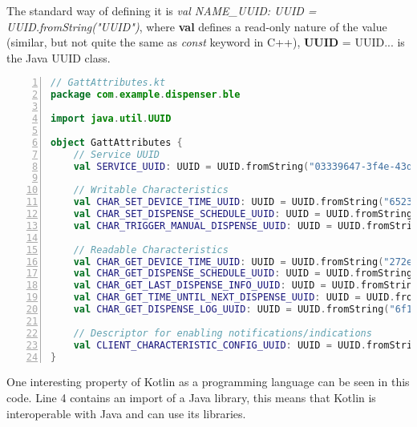 The standard way of defining it is \textit{val NAME\_UUID: UUID = UUID.fromString("UUID")}, where \textbf{val} defines a read-only nature of the value (similar, but not quite the same as \textit{const} keyword in C++), \textbf{UUID} = UUID... is the Java UUID class.



\begin{lstlisting}[style=kotlinstyle,caption={\ac{GATT} attributes defined in a separate file},label={lst:GATTs},float=htbp,language=Kotlin,numbers=left]
// GattAttributes.kt
package com.example.dispenser.ble

import java.util.UUID

object GattAttributes {
	// Service UUID
	val SERVICE_UUID: UUID = UUID.fromString("03339647-3f4e-43df-abff-fac54287cf1a")
	
	// Writable Characteristics
	val CHAR_SET_DEVICE_TIME_UUID: UUID = UUID.fromString("65232f1d-618a-4268-9050-0548142a4536")
	val CHAR_SET_DISPENSE_SCHEDULE_UUID: UUID = UUID.fromString("999c584e-06c0-49a1-995a-66b7c802ac1b")
	val CHAR_TRIGGER_MANUAL_DISPENSE_UUID: UUID = UUID.fromString("36bb95f2-e57e-4db9-b9aa-fb6541ee784e")
	
	// Readable Characteristics
	val CHAR_GET_DEVICE_TIME_UUID: UUID = UUID.fromString("272ee276-e37e-4d78-8c5e-bb7225d35074")
	val CHAR_GET_DISPENSE_SCHEDULE_UUID: UUID = UUID.fromString("b53c2ed4-ae26-476d-8414-011a025dddfc")
	val CHAR_GET_LAST_DISPENSE_INFO_UUID: UUID = UUID.fromString("40d3b5d8-5480-4b7b-a115-5fe86bf17d7d")
	val CHAR_GET_TIME_UNTIL_NEXT_DISPENSE_UUID: UUID = UUID.fromString("4b14acc4-768a-43e1-9d6c-0d97307e2666")
	val CHAR_GET_DISPENSE_LOG_UUID: UUID = UUID.fromString("6f182da7-c5a8-40ab-a637-f97ed6b5777b")
	
	// Descriptor for enabling notifications/indications
	val CLIENT_CHARACTERISTIC_CONFIG_UUID: UUID = UUID.fromString("00002902-0000-1000-8000-00805f9b34fb")
}
\end{lstlisting}
One interesting property of Kotlin as a programming language can be seen in this code. Line 4 contains an import of a Java library, this means that Kotlin is interoperable with Java and can use its libraries.

